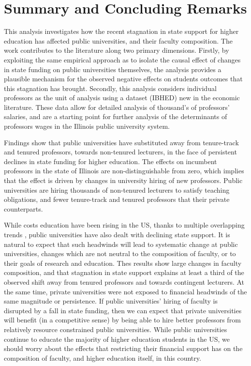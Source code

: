 \section{Summary and Concluding Remarks}
\label{sec:conclusion}

This analysis investigates how the recent stagnation in state support for higher education has affected public universities, and their faculty composition.
The work contributes to the literature along two primary dimensions.
Firstly, by exploiting the same empirical approach as \cite{NBERw23736,NBERw27885} to isolate the causal effect of changes in state funding on public universities themselves, the analysis provides a plausible mechanism for the observed negative effects on students outcomes that this stagnation has brought.
Secondly, this analysis considers individual professors as the unit of analysis using a dataset (IBHED) new in the economic literature.
These data allow for detailed analysis of thousand's of professors' salaries, and are a starting point for further analysis of the determinants of professors wages in the Illinois public university system. 

Findings show that public universities have substituted away from tenure-track and tenured professors, towards non-tenured lecturers, in the face of persistent declines in state funding for higher education.
The effects on incumbent professors in the state of Illinois are non-distinguishable from zero, which implies that the effect is driven by changes in university hiring of new professors.
Public universities are hiring thousands of non-tenured lecturers to satisfy teaching obligations, and fewer tenure-track and tenured professors that their private counterparts.

While costs education have been rising in the US, thanks to multiple overlapping trends \citep{ehrenberg2012}, public universities have also dealt with declining state support.
It is natural to expect that such headwinds will lead to systematic change at public universities, changes which are not neutral to the composition of faculty, or to their goals of research and education.
Thes results show large changes in faculty composition, and that stagnation in state support explains at least a third of the observed shift away from tenured professors and towards contingent lecturers.
At the same time, private universities were not exposed to financial headwinds of the same magnitude or persistence.
If public universities' hiring of faculty is disrupted by a fall in state funding, then we can expect that private universities will benefit (in a competitive sense) by being able to hire better professors from relatively resource constrained public universities.
While public universities continue to educate the majority of higher education students in the US, we should worry about the effects that restricting their financial support has on the composition of faculty, and  higher education itself, in this country.
